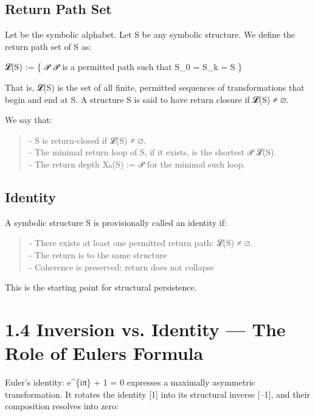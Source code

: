 \subsection{Return Path Set}\label{return-path-set}

Let \Sigma be the symbolic alphabet. Let S \in \Sigma* be any symbolic structure. We
define the return path set of S as:

𝓛(S) := \{ 𝒫 \textbar{} 𝒫 is a permitted path such that S_0 = S_k = S \}

That is, 𝓛(S) is the set of all finite, permitted sequences of
transformations that begin and end at S. A structure S is said to have
return closure if 𝓛(S) ≠ ∅.

We say that:

\begin{quote}
- S is return-closed if 𝓛(S) ≠ ∅.\\
- The minimal return loop of S, if it exists, is the shortest 𝒫 \in
𝓛(S).\\
- The return depth Xₕ(S) := \textbar 𝒫\textbar{} for the minimal such
loop.
\end{quote}

\subsection{Identity}\label{identity}

A symbolic structure S is provisionally called an identity if:

\begin{quote}
- There exists at least one permitted return path: 𝓛(S) ≠ ∅.\\
- The return is to the same structure\\
- Coherence is preserved: return does not collapse
\end{quote}

This is the starting point for structural persistence.

\section{1.4 \textbar{} Inversion vs. Identity --- The Role of
Euler\textquotesingle s
Formula}\label{inversion-vs.-identity-the-role-of-eulers-formula}

Euler's identity: e\^{}\{iπ\} + 1 = 0 expresses a maximally asymmetric
transformation. It rotates the identity {[}1{]} into its structural
inverse {[}--1{]}, and their composition resolves into zero:

